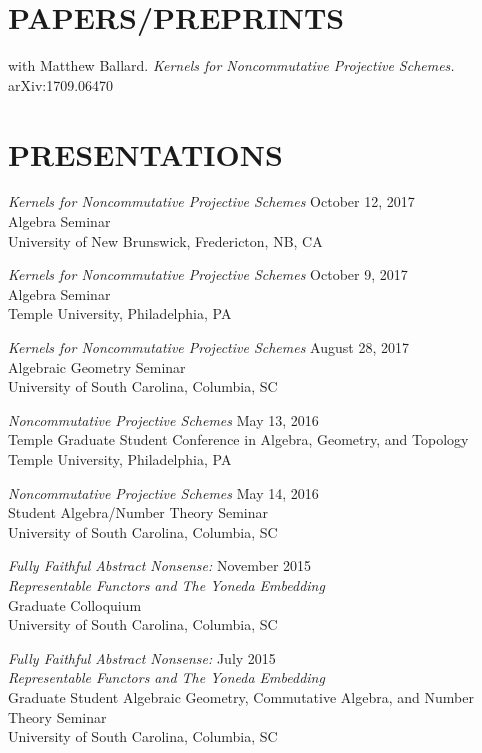 \documentclass[line,overlapped]{res}
\begin{document}
\begin{resume}
         \newpage
 \section{PAPERS/PREPRINTS}
         with Matthew Ballard.  \textsl{Kernels for Noncommutative Projective Schemes.} 
	  arXiv:1709.06470

          \section{PRESENTATIONS}
         \textsl{Kernels for Noncommutative Projective Schemes} \hfill October 12, 2017\\
         Algebra Seminar\\
         University of New Brunswick, Fredericton, NB, CA
         
         \textsl{Kernels for Noncommutative Projective Schemes} \hfill October 9, 2017\\
         Algebra Seminar\\
         Temple University, Philadelphia, PA
         
         \textsl{Kernels for Noncommutative Projective Schemes} \hfill August 28, 2017\\
         Algebraic Geometry Seminar\\
         University of South Carolina, Columbia, SC
         
         \textsl{Noncommutative Projective Schemes} \hfill May 13, 2016\\
         Temple Graduate Student Conference in Algebra, Geometry, and Topology\\
         Temple University, Philadelphia, PA

         \textsl{Noncommutative Projective Schemes} \hfill May 14, 2016\\
         Student Algebra/Number Theory Seminar\\
         University of South Carolina, Columbia, SC

         \textsl{Fully Faithful Abstract Nonsense:} \hfill November 2015\\
         \textsl{Representable Functors and The Yoneda Embedding}\\
         Graduate Colloquium\\
         University of South Carolina, Columbia, SC

         \textsl{Fully Faithful Abstract Nonsense:} \hfill July 2015\\
         \textsl{Representable Functors and The Yoneda Embedding}\\
         Graduate Student Algebraic Geometry, Commutative Algebra, and Number Theory Seminar\\
         University of South Carolina, Columbia, SC


\end{resume}
\end{document}

